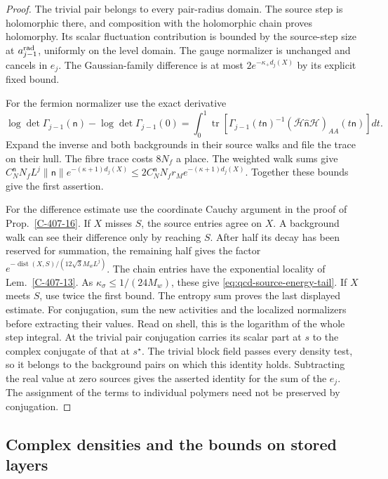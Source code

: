 \documentclass[11pt,letterpaper,reqno]{amsart}
\theoremstyle{definition}
\theoremstyle{remark}
\begin{document}
\begin{proof}
The trivial pair belongs to every pair-radius domain.
The source step is holomorphic there, and composition
with the holomorphic chain proves holomorphy. Its scalar
fluctuation contribution is bounded by the source-step
size at $a_{j-1}^{\rm rad}$, uniformly on the level domain.
The gauge normalizer is unchanged and cancels in $e_j$.
The Gaussian-family difference is at most
$2e^{-\kappa_+d_j(X)}$ by its explicit fixed bound.

For the fermion normalizer use the exact derivative
\[
 \log\det\Gamma_{j-1}(\mathsf n)-\log\det\Gamma_{j-1}(0)
 =\int_0^1\operatorname{tr}\left[
 \Gamma_{j-1}(t\mathsf n)^{-1}
 (\bar{\mathcal H}\widehat{\mathsf n}\mathcal H)_{AA}
                       (t\mathsf n)\right]dt.
\]
Expand the inverse and both backgrounds in their source
walks and file the trace on their hull. The fibre trace
costs $8N_f$ a place. The weighted walk sums give
$C_N^{\mathsf n}N_fL^j\|\mathsf n\|e^{-(\kappa+1)d_j(X)}
\le2C_N^{\mathsf n}N_fr_Me^{-(\kappa+1)d_j(X)}$.
Together these bounds give the first assertion.

For the difference estimate use the coordinate Cauchy
argument in the proof of Prop.~\ref{C-407-16}.
If $X$ misses $S$, the source entries agree on $X$.
A background walk can see their difference only by
reaching $S$. After half its decay has been reserved
for summation, the remaining half gives the factor
$e^{-\operatorname{dist}(X,S)/(12\sqrt3M_wL^j)}$.
The chain entries have the exponential locality of
Lem.~\ref{C-407-13}. As
$\kappa_\sigma\le1/(24M_w)$, these give
\eqref{eq:qcd-source-energy-tail}. If $X$ meets $S$,
use twice the first bound. The entropy sum proves the
last displayed estimate. For conjugation, sum the new activities
and the localized normalizers before extracting their values.
Read on shell, this is the logarithm of the whole step integral.
At the trivial pair conjugation carries its scalar part at $s$
to the complex conjugate of that at $s^\star$. The trivial
block field passes every density test, so it belongs to the
background pairs on which this identity holds. Subtracting
the real value at zero sources gives the asserted identity
for the sum of the $e_j$. The assignment of the terms to
individual polymers need not be preserved by conjugation.
\end{proof}

\subsection{Complex densities and the bounds on stored layers}
\end{document}

